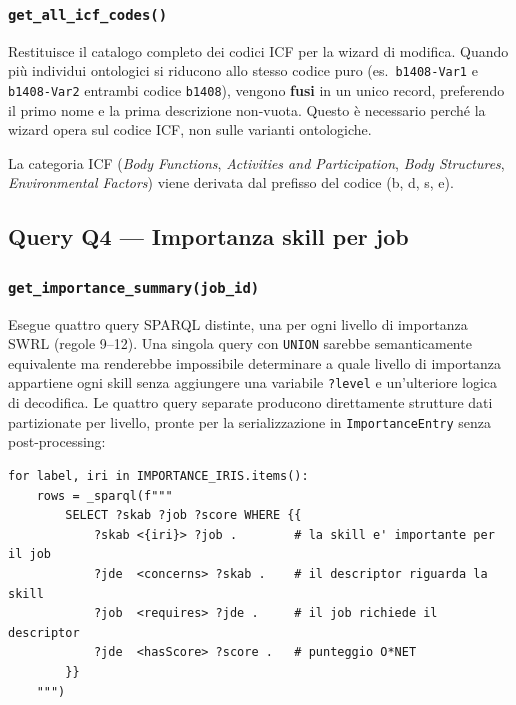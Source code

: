 \documentclass[a4paper,12pt]{article}
\begin{document}
\noindent \subsubsection{\texttt{get\_all\_icf\_codes()}}

Restituisce il catalogo completo dei codici ICF per la wizard di
modifica. Quando pi\`{u} individui ontologici si riducono allo stesso
codice puro (es.\ \texttt{b1408-Var1} e \texttt{b1408-Var2} entrambi
codice \texttt{b1408}), vengono \textbf{fusi} in un unico record,
preferendo il primo nome e la prima descrizione non-vuota. Questo
\`{e} necessario perch\'{e} la wizard opera sul codice ICF, non sulle
varianti ontologiche.

La categoria ICF (\textit{Body Functions}, \textit{Activities and
Participation}, \textit{Body Structures}, \textit{Environmental Factors})
viene derivata dal prefisso del codice (b, d, s, e).

\subsection{Query Q4 --- Importanza skill per job}

\subsubsection{\texttt{get\_\allowbreak{}importance\_\allowbreak{}summary(job\_\allowbreak{}id)}}

Esegue quattro query SPARQL distinte, una per ogni livello di importanza
SWRL (regole 9--12). Una singola query con \texttt{UNION} sarebbe semanticamente
equivalente ma renderebbe impossibile determinare a quale livello di importanza
appartiene ogni skill senza aggiungere una variabile \texttt{?level} e
un'ulteriore logica di decodifica. Le quattro query separate producono
direttamente strutture dati partizionate per livello, pronte per la
serializzazione in \texttt{ImportanceEntry} senza post-processing:

\begin{lstlisting}[caption={Pattern delle query Q4 per importanza.}]
for label, iri in IMPORTANCE_IRIS.items():
    rows = _sparql(f"""
        SELECT ?skab ?job ?score WHERE {{
            ?skab <{iri}> ?job .        # la skill e' importante per il job
            ?jde  <concerns> ?skab .    # il descriptor riguarda la skill
            ?job  <requires> ?jde .     # il job richiede il descriptor
            ?jde  <hasScore> ?score .   # punteggio O*NET
        }}
    """)
\end{lstlisting}
\end{document}
